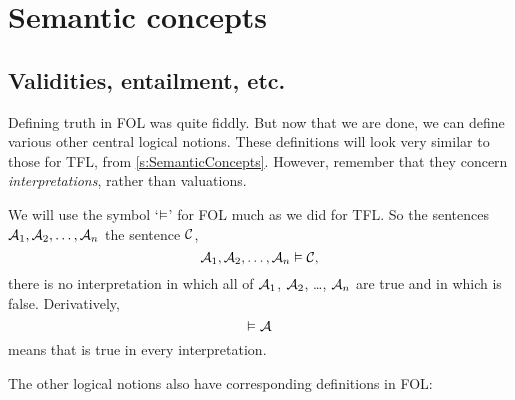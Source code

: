 \chapter{Semantic concepts}

\section{Validities, entailment, etc.}

Defining truth in FOL was quite fiddly. But now that we are done, we can define various other central logical notions. These definitions will look very similar to those for TFL, from \cref{s:SemanticConcepts}. However, remember that they concern \emph{interpretations}, rather than valuations.

We will use the symbol `$\vDash$' for FOL much as we did for TFL. So
the sentences $\mathcal{A}_1, \mathcal{A}_2, \ldots, \mathcal{A}_n$
 the sentence $\mathcal{C}$,
	$$\mathcal{A}_1, \mathcal{A}_2, \ldots, \mathcal{A}_n \vDash\mathcal{C},$$
\ifeff{} there is no interpretation in which all of $\mathcal{A}_1$, $\mathcal{A}_2$, \dots, $\mathcal{A}_n$ are true and in which  is false. Derivatively,
	$$\vDash\mathcal{A}$$
means that  is true in every interpretation.

The other logical notions also have corresponding definitions in FOL:

